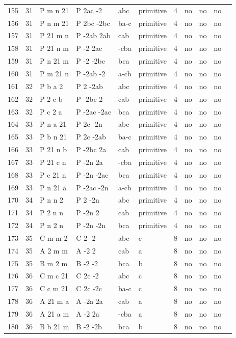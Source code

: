 \begin{center}
\begin{small}
\begin{longtable}{|l|l|l|l|l|l|l|l|l|l|l|}
155 &31 &P m n 21 &P 2ac -2 &abc &primitive &4 &no &no &no \\ 
156 &31 &P n m 21 &P 2bc -2bc &ba-c &primitive &4 &no &no &no \\ 
157 &31 &P 21 m n &P -2ab 2ab &cab &primitive &4 &no &no &no \\ 
158 &31 &P 21 n m &P -2 2ac &-cba &primitive &4 &no &no &no \\ 
159 &31 &P n 21 m &P -2 -2bc &bca &primitive &4 &no &no &no \\ 
160 &31 &P m 21 n &P -2ab -2 &a-cb &primitive &4 &no &no &no \\ 
161 &32 &P b a 2 &P 2 -2ab &abc &primitive &4 &no &no &no \\ 
162 &32 &P 2 c b &P -2bc 2 &cab &primitive &4 &no &no &no \\ 
163 &32 &P c 2 a &P -2ac -2ac &bca &primitive &4 &no &no &no \\ 
164 &33 &P n a 21 &P 2c -2n &abc &primitive &4 &no &no &no \\ 
165 &33 &P b n 21 &P 2c -2ab &ba-c &primitive &4 &no &no &no \\ 
166 &33 &P 21 n b &P -2bc 2a &cab &primitive &4 &no &no &no \\ 
167 &33 &P 21 c n &P -2n 2a &-cba &primitive &4 &no &no &no \\ 
168 &33 &P c 21 n &P -2n -2ac &bca &primitive &4 &no &no &no \\ 
169 &33 &P n 21 a &P -2ac -2n &a-cb &primitive &4 &no &no &no \\ 
170 &34 &P n n 2 &P 2 -2n &abc &primitive &4 &no &no &no \\ 
171 &34 &P 2 n n &P -2n 2 &cab &primitive &4 &no &no &no \\ 
172 &34 &P n 2 n &P -2n -2n &bca &primitive &4 &no &no &no \\ 
173 &35 &C m m 2 &C 2 -2 &abc &c &8 &no &no &no \\ 
174 &35 &A 2 m m &A -2 2 &cab &a &8 &no &no &no \\ 
175 &35 &B m 2 m &B -2 -2 &bca &b &8 &no &no &no \\ 
176 &36 &C m c 21 &C 2c -2 &abc &c &8 &no &no &no \\ 
177 &36 &C c m 21 &C 2c -2c &ba-c &c &8 &no &no &no \\ 
178 &36 &A 21 m a &A -2a 2a &cab &a &8 &no &no &no \\ 
179 &36 &A 21 a m &A -2 2a &-cba &a &8 &no &no &no \\ 
180 &36 &B b 21 m &B -2 -2b &bca &b &8 &no &no &no \\ 

\end{longtable}
\end{small}
\end{center}

